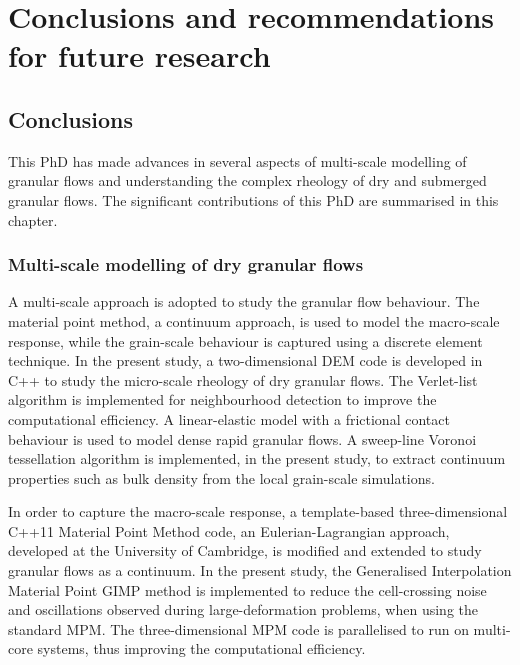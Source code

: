 \chapter{Conclusions and recommendations for future research}

\ifpdf
    \graphicspath{{Chapter7/figs/raster/}{Chapter7/figs/pdf/}{Chapter7/figs/}}
\else
    \graphicspath{{Chapter7/figs/vector/}{Chapter7/figs/}}
\fi
\section{Conclusions}

This PhD has made advances in several aspects of multi-scale modelling of 
granular flows and understanding the complex rheology of dry and submerged 
granular flows. The significant contributions of this PhD are summarised in 
this chapter.

\subsection{Multi-scale modelling of dry granular flows}

A multi-scale approach is adopted to study the granular flow behaviour. The 
material point method, a continuum approach, is used to model the macro-scale 
response, while the grain-scale behaviour is captured using a discrete element 
technique. In the present study, a two-dimensional DEM code is developed in C++ 
to study the micro-scale rheology of dry granular flows. The Verlet-list 
algorithm is implemented for neighbourhood detection to improve the 
computational efficiency. A linear-elastic model with a frictional contact 
behaviour is used to model dense rapid granular flows. A sweep-line Voronoi 
tessellation algorithm is implemented, in the present study, to extract 
continuum properties such as bulk density from the local grain-scale 
simulations.

In order to capture the macro-scale response, a template-based 
three-dimensional C++11 Material Point Method code, an Eulerian-Lagrangian 
approach, developed at the University of Cambridge, is modified and extended to 
study granular flows as a continuum. In the present study, the Generalised 
Interpolation Material Point GIMP method is implemented to reduce the 
cell-crossing noise and oscillations observed during large-deformation 
problems, when using the standard MPM. The three-dimensional MPM code is 
parallelised to run on multi-core systems, thus improving the computational 
efficiency. 



